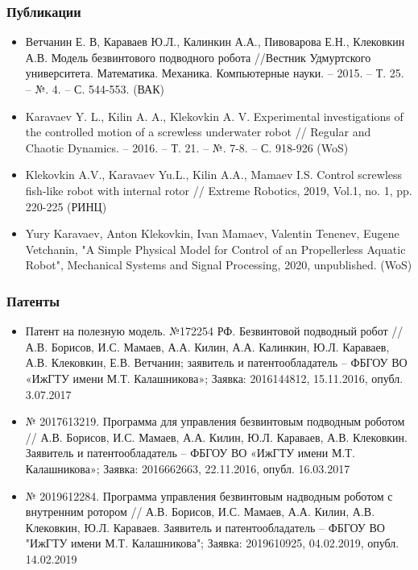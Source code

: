 \begin{frame}
\frametitle{Публикации}
\begin{itemize}

\item Ветчанин Е. В, Караваев Ю.Л., Калинкин А.А., Пивоварова Е.Н., Клековкин А.В. Модель безвинтового подводного робота //Вестник Удмуртского университета. Математика. Механика. Компьютерные науки. – 2015. – Т. 25. – №. 4. – С. 544-553. (ВАК)

\item Karavaev Y. L., Kilin A. A., Klekovkin A. V. Experimental investigations of the controlled motion of a screwless underwater robot // Regular and Chaotic Dynamics. – 2016. – Т. 21. – №. 7-8. – С. 918-926 (WoS)

\item Klekovkin A.V., Karavaev Yu.L., Kilin A.A., Mamaev I.S. Control screwless fish-like robot with internal rotor // Extreme Robotics,  2019, Vol.1, no. 1, pp. 220-225 (РИНЦ)

\item Yury Karavaev, Anton Klekovkin, Ivan Mamaev, Valentin Tenenev, Eugene Vetchanin, "A Simple Physical Model for Control of an Propellerless Aquatic Robot",  Mechanical Systems and Signal Processing, 2020, unpublished. (WoS)

\end{itemize}
\end{frame}

\begin{frame}
\frametitle{Патенты}
\begin{itemize}



\item Патент на полезную модель. №172254 РФ. Безвинтовой подводный робот //  А.В. Борисов, И.С. Мамаев, А.А. Килин, А.А. Калинкин, Ю.Л. Караваев, А.В. Клековкин, Е.В. Ветчанин; заявитель и патентообладатель – ФБГОУ ВО «ИжГТУ имени М.Т. Калашникова»; Заявка: 2016144812, 15.11.2016, опубл. 3.07.2017


\item № 2017613219. Программа для управления безвинтовым подводным роботом // А.В. Борисов, И.С. Мамаев, А.А. Килин, Ю.Л. Караваев, А.В. Клековкин. Заявитель и патентообладатель – ФБГОУ ВО «ИжГТУ имени М.Т. Калашникова»; Заявка: 2016662663, 22.11.2016, опубл. 16.03.2017


\item № 2019612284. Программа управления безвинтовым надводным роботом с внутренним ротором // А.В. Борисов, И.С. Мамаев, А.А. Килин, А.В. Клековкин, Ю.Л. Караваев. Заявитель и патентообладатель – ФБГОУ ВО "ИжГТУ имени М.Т. Калашникова"; Заявка: 2019610925, 04.02.2019, опубл. 14.02.2019


\end{itemize}
\end{frame}

